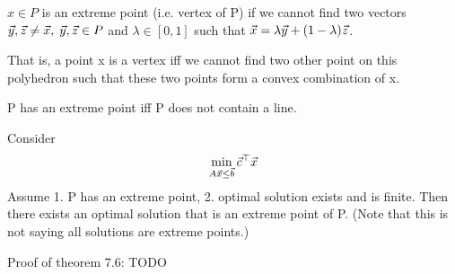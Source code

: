 \begin{definition}
	$x\in P$ is an extreme point (i.e. vertex of P) if we cannot find two vectors $\vec{y},\vec{z}\neq\vec{x},\;\vec{y},\vec{z}\in P$ and $\lambda\in[0,1]$ such that $\vec{x}=\lambda\vec{y}+(1- \lambda)\vec{z}$.

	\noindent That is, a point x is a vertex iff we cannot find two other point on this polyhedron such that these two points form a convex combination of x.
\end{definition}

\begin{theorem}
	P has an extreme point iff P does not contain a line.
\end{theorem}

\begin{theorem}
	Consider
	\[
\min_{A\vec{x}\le\vec{b}} \vec{c}^\top\vec{x}
	\]
	Assume 1. P has an extreme point, 2. optimal solution exists and is finite. Then there exists an optimal solution that is an extreme point of P. (Note that this is not saying all solutions are extreme points.)
\end{theorem}
Proof of theorem 7.6: TODO
